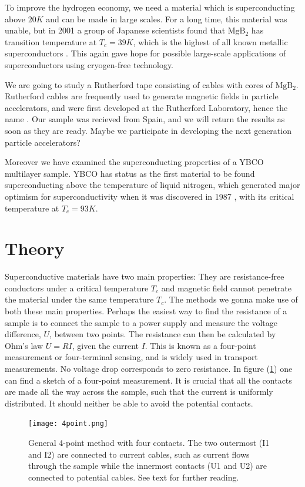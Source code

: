 \documentclass{comjnl}
\newcommand*\chem[1]{\ensuremath{\mathrm{#1}}}
\begin{document}
To improve the hydrogen economy, we need a material which is superconducting above $20K$ and can be made in large scales. For a long time, this material was unable, but in 2001 a group of Japanese scientists found that \chem{MgB_2} has transition temperature at $T_c=39K$, which is the highest of all known metallic superconductors \cite {jsap}\cite {nature}. This again gave hope for possible large-scale applications of superconductors using cryogen-free technology. 

We are going to study a Rutherford tape consisting of cables with cores of \chem{MgB_2}. Rutherford cables are frequently used to generate magnetic fields in particle accelerators, and were first developed at the Rutherford Laboratory, hence the name \cite {fnal}. Our sample was recieved from Spain, and we will return the results as soon as they are ready. Maybe we participate in developing the next generation particle accelerators?

Moreover we have examined the superconducting properties of a YBCO multilayer sample. YBCO has status as the first material to be found superconducting above the temperature of liquid nitrogen, which generated major optimism for superconductivity when it was discovered in 1987 \cite{harvard}, with its critical temperature at $T_c=93K$. 

\section{Theory}\label{Sec:Theory}
Superconductive materials have two main properties: They are resistance-free conductors under a critical temperature $T_c$ and magnetic field cannot penetrate the material under the same temperature $T_c$. The methods we gonna make use of both these main properties. Perhaps the easiest way to find the resistance of a sample is to connect the sample to a power supply and measure the voltage difference, $U$, between two points. The resistance can then be calculated by Ohm's law $U=RI$, given the current $I$. This is known as a four-point measurement or four-terminal sensing, and is widely used in transport measurements. No voltage drop corresponds to zero resistance. In figure (\ref{fig:4point}) one can find a sketch of a four-point measurement. It is crucial that all the contacts are made all the way across the sample, such that the current is uniformly distributed. It should neither be able to avoid the potential contacts.
\begin{figure}[h]
\centering
\texttt{[image: 4point.png]}
\caption{General 4-point method with four contacts. The two outermost (I1 and I2) are connected to current cables, such as current flows through the sample while the innermost contacts (U1 and U2) are connected to potential cables. See text for further reading. \label{fig:4point}}
\end{figure}
\end{document}
